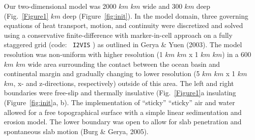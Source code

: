 \documentclass[draft,linenumbers]{agujournal2018} %
\providecommand{\DIFaddtex}[1]{{\protect\color{blue} \sf #1}} %
\providecommand{\DIFdeltex}[1]{{\protect\color{red} \scriptsize #1}} %
\providecommand{\DIFaddbegin}{} %
\providecommand{\DIFaddend}{} %
\providecommand{\DIFdelbegin}{} %
\providecommand{\DIFdelend}{} %
\providecommand{\DIFadd}[1]{\texorpdfstring{\DIFaddtex{#1}}{#1}} %
\providecommand{\DIFdel}[1]{\texorpdfstring{\DIFdeltex{#1}}{}} %
\newcommand{\DIFscaledelfig}{0.3}
\newlength{\DIFdelgraphicswidth} %
\newlength{\DIFdelgraphicsheight} %
\newcommand{\DIFaddincludegraphics}[2][]{{\color{blue}\fbox{\DIFOincludegraphics[#1]{#2}}}} %
\newcommand{\DIFdelincludegraphics}[2][]{%
\sbox{\DIFdelgraphicsbox}{\DIFOincludegraphics[#1]{#2}}%
\settoboxwidth{\DIFdelgraphicswidth}{\DIFdelgraphicsbox} %
\settoboxtotalheight{\DIFdelgraphicsheight}{\DIFdelgraphicsbox} %
\scalebox{\DIFscaledelfig}{%
\parbox[b]{\DIFdelgraphicswidth}{\usebox{\DIFdelgraphicsbox}\\[-\baselineskip] \rule{\DIFdelgraphicswidth}{0em}}\llap{\resizebox{\DIFdelgraphicswidth}{\DIFdelgraphicsheight}{%
\setlength{\unitlength}{\DIFdelgraphicswidth}%
\begin{picture}(1,1)%
\thicklines\linethickness{2pt} %
{\color[rgb]{1,0,0}\put(0,0){\framebox(1,1){}}}%
{\color[rgb]{1,0,0}\put(0,0){\line( 1,1){1}}}%
{\color[rgb]{1,0,0}\put(0,1){\line(1,-1){1}}}%
\end{picture}%
}\hspace*{3pt}}} %
} %
\DeclareRobustCommand{\DIFaddbegin}{\DIFOaddbegin \let\includegraphics\DIFaddincludegraphics} %
\DeclareRobustCommand{\DIFaddend}{\DIFOaddend \let\includegraphics\DIFOincludegraphics} %
\DeclareRobustCommand{\DIFdelbegin}{\DIFOdelbegin \let\includegraphics\DIFdelincludegraphics} %
\DeclareRobustCommand{\DIFdelend}{\DIFOaddend \let\includegraphics\DIFOincludegraphics} %
\begin{document}
\DIFaddend Our two-dimensional model was 2000 \DIFdelbegin \DIFdel{$km$ }\DIFdelend \DIFaddbegin \DIFadd{\(km\) }\DIFaddend wide and 300 \DIFdelbegin \DIFdel{$km$ deep
(Fig.~\ref{Figure1}}\DIFdelend \DIFaddbegin \DIFadd{\(km\) deep
(Figure~\ref{fig:init}}\DIFaddend ). In the model domain, three governing equations
of heat transport, motion, and continuity were discretized and solved
using a conservative finite-difference with marker-in-cell approach on a
fully staggered grid \DIFaddbegin \DIFadd{(code: }\texttt{\DIFadd{I2VIS}}\DIFadd{) }\DIFaddend as outlined in \DIFdelbegin %
\DIFdelend \DIFaddbegin \DIFadd{Gerya \& Yuen
(2003)}\DIFaddend . The model resolution was non-uniform with higher resolution (1
\DIFdelbegin \DIFdel{$km$ }\DIFdelend \DIFaddbegin \DIFadd{\(km\) }\DIFaddend x 1 \DIFdelbegin \DIFdel{$km$}\DIFdelend \DIFaddbegin \DIFadd{\(km\)}\DIFaddend ) in a 600 \DIFdelbegin \DIFdel{$km$ }\DIFdelend \DIFaddbegin \DIFadd{\(km\) }\DIFaddend wide area surrounding the contact
between the ocean basin and continental margin and gradually changing to
lower resolution (5 \DIFdelbegin \DIFdel{$km$ }\DIFdelend \DIFaddbegin \DIFadd{\(km\) }\DIFaddend x 1 \DIFdelbegin \DIFdel{$km$}\DIFdelend \DIFaddbegin \DIFadd{\(km\)}\DIFaddend , x- and z-directions,
respectively) outside of this area. The left and right boundaries were
free-slip and thermally \DIFdelbegin \DIFdel{insulative (Fig.~\ref{Figure1}a}\DIFdelend \DIFaddbegin \DIFadd{insulating (Figure~\ref{fig:init}a, b}\DIFaddend ). The
implementation of \DIFdelbegin \DIFdel{“sticky” }\DIFdelend \DIFaddbegin \DIFadd{``sticky'' }\DIFaddend air and water allowed for a free
topographical surface with a simple linear sedimentation and erosion
model. The lower boundary was open to allow for slab penetration and
spontaneous slab motion \DIFdelbegin %
\DIFdelend \DIFaddbegin \DIFadd{(Burg \& Gerya, 2005)}\DIFaddend .
\end{document}
